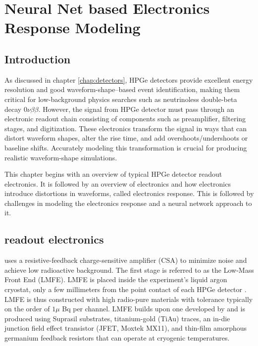 \chapter{Neural Net based Electronics Response Modeling}
\label{chap:elect_resp}

\section{Introduction}
As discussed in chapter \ref{chap:detectors}, HPGe detectors provide excellent energy resolution and good waveform-shape–based event identification, making them critical for low-background physics searches such as neutrinoless double-beta decay $0\nu\beta\beta$. However, the signal from HPGe detector must pass through an electronic readout chain consisting of components such as preamplifier, filtering stages, and digitization. These electronics transform the signal in ways that can distort waveform shapes, alter the rise time, and add overshoots/undershoots or baseline shifts. Accurately modeling this transformation is crucial for producing realistic waveform-shape simulations.

This chapter begins with an overview of typical HPGe detector readout electronics. It is followed by an overview of {\Ltwo}  electronics and how electronics introduce distortions in waveforms, called electronics response. This is followed by challenges in modeling the electronics response and a neural network approach to it.

\section{{\Ltwo} readout electronics}

{\Ltwo} uses a resistive-feedback charge-sensitive amplifier (CSA) to minimize noise and achieve low radioactive background. The first stage is referred to as the Low-Mass Front End (LMFE). LMFE is placed inside the experiment’s liquid argon cryostat, only a few millimeters from the point contact of each HPGe detector \cite{Willers_2020}. LMFE is thus constructed with high radio-pure materials with tolerance typically on the order of $1\mu$ Bq per channel. LMFE builds upon one developed by {\MJD} and is produced using Suprasil substrates, titanium-gold (TiAu) traces, an in-die junction field effect transistor (JFET, Moxtek MX11), and thin-film amorphous germanium feedback resistors that can operate at cryogenic temperatures. 

